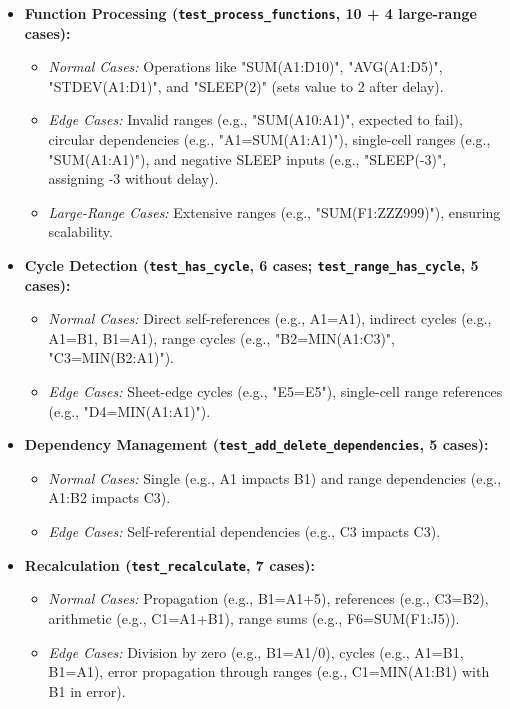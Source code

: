 \documentclass[12pt,letterpaper,onecolumn]{exam}
\begin{document}
\begin{itemize}
    \item \textbf{Function Processing (\texttt{test\_process\_functions}, 10 + 4 large-range cases):}
    \begin{itemize}
        \item \textit{Normal Cases:} Operations like "SUM(A1:D10)", "AVG(A1:D5)", "STDEV(A1:D1)", and "SLEEP(2)" (sets value to 2 after delay).
        \item \textit{Edge Cases:} Invalid ranges (e.g., "SUM(A10:A1)", expected to fail), circular dependencies (e.g., "A1=SUM(A1:A1)"), single-cell ranges (e.g., "SUM(A1:A1)"), and negative SLEEP inputs (e.g., "SLEEP(-3)", assigning -3 without delay).
        \item \textit{Large-Range Cases:} Extensive ranges (e.g., "SUM(F1:ZZZ999)"), ensuring scalability.
    \end{itemize}

    \item \textbf{Cycle Detection (\texttt{test\_has\_cycle}, 6 cases; \texttt{test\_range\_has\_cycle}, 5 cases):}
    \begin{itemize}
        \item \textit{Normal Cases:} Direct self-references (e.g., A1=A1), indirect cycles (e.g., A1=B1, B1=A1), range cycles (e.g., "B2=MIN(A1:C3)", "C3=MIN(B2:A1)").
        \item \textit{Edge Cases:} Sheet-edge cycles (e.g., "E5=E5"), single-cell range references (e.g., "D4=MIN(A1:A1)").
    \end{itemize}

    \item \textbf{Dependency Management (\texttt{test\_add\_delete\_dependencies}, 5 cases):}
    \begin{itemize}
        \item \textit{Normal Cases:} Single (e.g., A1 impacts B1) and range dependencies (e.g., A1:B2 impacts C3).
        \item \textit{Edge Cases:} Self-referential dependencies (e.g., C3 impacts C3).
    \end{itemize}

    \item \textbf{Recalculation (\texttt{test\_recalculate}, 7 cases):}
    \begin{itemize}
        \item \textit{Normal Cases:} Propagation (e.g., B1=A1+5), references (e.g., C3=B2), arithmetic (e.g., C1=A1+B1), range sums (e.g., F6=SUM(F1:J5)).
        \item \textit{Edge Cases:} Division by zero (e.g., B1=A1/0), cycles (e.g., A1=B1, B1=A1), error propagation through ranges (e.g., C1=MIN(A1:B1) with B1 in error).
    \end{itemize}


\end{itemize}
\end{document}
